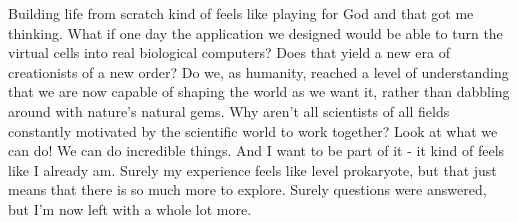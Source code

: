 Building life from scratch kind of feels like playing for God and that got me thinking. What if one day the application we designed would be able to turn the virtual cells into real biological computers? Does that yield a new era of creationists of a new order? Do we, as humanity, reached a level of understanding that we are now capable of shaping the world as we want it, rather than dabbling around with nature's natural gems. Why aren't all scientists of all fields constantly motivated by the scientific world to work together? Look at what we can do! We can do incredible things. And I want to be part of it - it kind of feels like I already am. Surely my experience feels like level prokaryote, but that just means that there is so much more to explore. Surely questions were answered, but I'm now left with a whole lot more.

